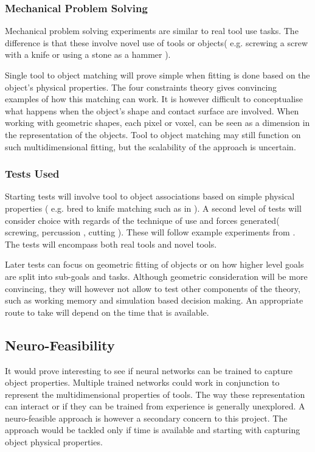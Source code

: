 \documentclass[11]{article}
\begin{document}
\subsubsection*{Mechanical Problem Solving}

Mechanical problem solving experiments are similar to real tool use tasks. The difference is that these involve novel use of tools or objects( e.g. screwing a screw with a knife\cite{baumard2014} or using a stone as a hammer\cite{zhu2015} ). 

Single  tool to object matching will prove simple when fitting is done based on the object's physical properties. The four constraints theory gives convincing examples of how this matching can work. It is however difficult to conceptualise what happens when the object's shape and contact surface are involved. When working with geometric shapes, each pixel or voxel, can be seen as a dimension in the representation of the objects. Tool to object matching may still function on such multidimensional fitting, but the scalability of the approach is uncertain. 

\subsubsection*{Tests Used}

Starting tests will involve tool to object associations based on simple physical properties ( e.g. bred to knife matching such as in \cite{osiurak2014} ). A second level of tests will consider choice with regards of the technique of use and forces generated( screwing, percussion , cutting ). These will follow example experiments from \cite{zhu2015}. The tests will encompass both real tools and novel tools.  

Later tests can focus on geometric fitting of objects or on how higher level goals are split into sub-goals and tasks. Although geometric consideration will be more convincing, they will however not allow to test other components of the theory, such as working memory and simulation based decision making. An appropriate route to take will depend on the time that is available. 

\subsection*{Neuro-Feasibility}
It would prove interesting to see if neural networks can be trained to capture object properties. Multiple trained networks could work in conjunction to represent the multidimensional properties of tools. The way these representation can interact or if they can be trained from experience is generally unexplored. A neuro-feasible approach is however a secondary concern to this project. The approach would be tackled only if time is available and starting with capturing object physical properties. 
\end{document}
